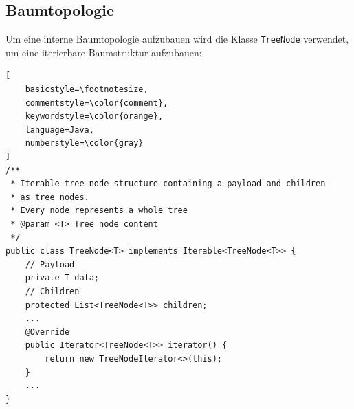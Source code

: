\subsection*{Baumtopologie}
Um eine interne Baumtopologie aufzubauen wird die Klasse \texttt{TreeNode} verwendet, um eine iterierbare Baumstruktur
aufzubauen:
\begin{lstlisting}[
    basicstyle=\footnotesize,
    commentstyle=\color{comment},
    keywordstyle=\color{orange},
    language=Java,
    numberstyle=\color{gray}
]
/**
 * Iterable tree node structure containing a payload and children
 * as tree nodes.
 * Every node represents a whole tree
 * @param <T> Tree node content
 */
public class TreeNode<T> implements Iterable<TreeNode<T>> {
    // Payload
    private T data;
    // Children
    protected List<TreeNode<T>> children;
    ...
    @Override
    public Iterator<TreeNode<T>> iterator() {
        return new TreeNodeIterator<>(this);
    }
    ...
}
\end{lstlisting}

